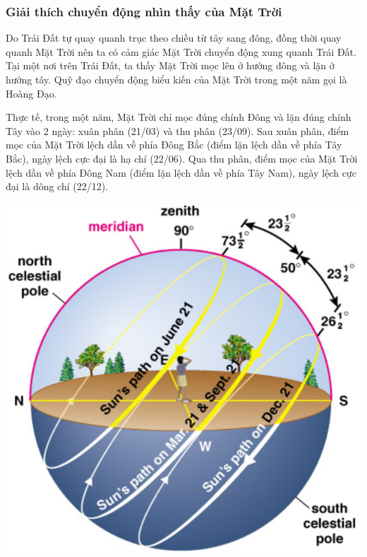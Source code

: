\subsubsection{Giải thích chuyển động nhìn thấy của Mặt Trời}
\begin{minipage}[l]{0.6\textwidth}
	Do Trái Đất tự quay quanh trục theo chiều từ tây sang đông, đồng thời quay quanh Mặt Trời nên ta có cảm giác Mặt Trời chuyển động xung quanh Trái Đất. Tại một nơi trên Trái Đất, ta thấy Mặt Trời mọc lên ở hướng đông và lặn ở hướng tây. Quỹ đạo chuyển động biểu kiến của Mặt Trời trong một năm gọi là Hoàng Đạo.
	
	Thực tế, trong một năm, Mặt Trời chỉ mọc đúng chính Đông và lặn đúng chính Tây vào 2 ngày: xuân phân (21/03) và thu phân (23/09). Sau xuân phân, điểm mọc của Mặt Trời lệch dần về phía Đông Bắc (điểm lặn lệch dần về phía Tây Bắc), ngày lệch cực đại là hạ chí (22/06). Qua thu phân, điểm mọc của Mặt Trời lệch dần về phía Đông Nam (điểm lặn lệch dần về phía Tây Nam), ngày lệch cực đại là dông chí (22/12).
\end{minipage}
\begin{minipage}[r]{0.4\textwidth}
	\begin{center}
		\includegraphics[scale=0.5]{../figs/G10-034-4.png}
	\end{center}
\end{minipage}

